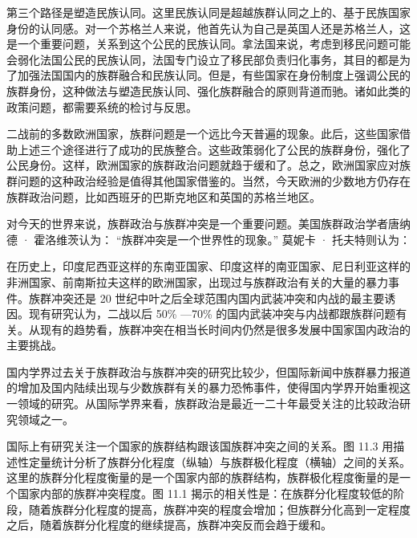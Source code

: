 第三个路径是塑造民族认同。这里民族认同是超越族群认同之上的、基于民族国家身份的认同感。对一个苏格兰人来说，他首先认为自己是英国人还是苏格兰人，这是一个重要问题，关系到这个公民的民族认同。拿法国来说，考虑到移民问题可能会弱化法国公民的民族认同，法国专门设立了移民部负责归化事务，其目的都是为了加强法国国内的族群融合和民族认同。但是，有些国家在身份制度上强调公民的族群身份，这种做法与塑造民族认同、强化族群融合的原则背道而驰。诸如此类的政策问题，都需要系统的检讨与反思。

二战前的多数欧洲国家，族群问题是一个远比今天普遍的现象。此后，这些国家借助上述三个途径进行了成功的民族整合。这些政策弱化了公民的族群身份，强化了公民身份。这样，欧洲国家的族群政治问题就趋于缓和了。总之，欧洲国家应对族群问题的这种政治经验是值得其他国家借鉴的。当然，今天欧洲的少数地方仍存在族群政治问题，比如西班牙的巴斯克地区和英国的苏格兰地区。


对今天的世界来说，族群政治与族群冲突是一个重要问题。美国族群政治学者唐纳德 · 霍洛维茨认为： “族群冲突是一个世界性的现象。” 莫妮卡 · 托夫特则认为：


在历史上，印度尼西亚这样的东南亚国家、印度这样的南亚国家、尼日利亚这样的非洲国家、前南斯拉夫这样的欧洲国家，出现过与族群政治有关的大量的暴力事件。族群冲突还是 20 世纪中叶之后全球范围内国内武装冲突和内战的最主要诱因。现有研究认为，二战以后 50\% —70\% 的国内武装冲突与内战都跟族群问题有关。从现有的趋势看，族群冲突在相当长时间内仍然是很多发展中国家国内政治的主要挑战。

国内学界过去关于族群政治与族群冲突的研究比较少，但国际新闻中族群暴力报道的增加及国内陆续出现与少数族群有关的暴力恐怖事件，使得国内学界开始重视这一领域的研究。从国际学界来看，族群政治是最近一二十年最受关注的比较政治研究领域之一。

国际上有研究关注一个国家的族群结构跟该国族群冲突之间的关系。图 11.3 用描述性定量统计分析了族群分化程度（纵轴）与族群极化程度（横轴）之间的关系。这里的族群分化程度衡量的是一个国家内部的族群结构，族群极化程度衡量的是一个国家内部的族群冲突程度。图 11.1 揭示的相关性是：在族群分化程度较低的阶段，随着族群分化程度的提高，族群冲突的程度会增加；但族群分化高到一定程度之后，随着族群分化程度的继续提高，族群冲突反而会趋于缓和。

